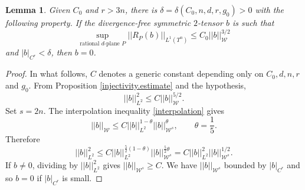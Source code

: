 \documentclass[11pt]{amsart}
\newtheorem{lemm}[thm]{Lemma}
\theoremstyle{remark}
\theoremstyle{definition}
\begin{document}
	\begin{lemm}\label{lemm.quadr.estimate}
		Given $C_0$ and $r>3n$, there is {$\delta=\delta(C_0,n,d,r,g_0)>0$} with the following property. If the divergence-free symmetric $2$-tensor $b$ is such that
		$$
		\sup_{\text{rational }d\text{-plane }P}||R_P(b)||_{L^1(T^n)}\leq C_0||b||_{\mathcal W}^{3/2}
		$$
		and $|b|_{C^r}<\delta$, then $b=0$.
	\end{lemm}
	\begin{proof}
		In what follows, $C$ denotes a generic constant depending only on $C_0,d,n,r$ and $g_0$.
		From Proposition \ref{injectivity.estimate} and the hypothesis,
		$$
		||b||_{L^2}^2\leq C||b||_{\mathcal W}^{5/2}.
		$$
		Set $s=2n$. The interpolation inequality \eqref{interpolation} gives
		$$
		||b||_{\mathcal W}\leq C||b||_{L^2}^{1-\theta}||b||_{\mathcal W^s}^\theta,\qquad \theta=\frac{1}{5}.
		$$
		Therefore
		$$
		||b||_{L^2}^2\leq C||b||_{L^2}^{\frac52(1-\theta)}||b||_{\mathcal W^s}^{\frac52\theta}=C||b||_{L^2}^2||b||_{\mathcal W^s}^{1/2}.
		$$
		If $b\neq0$, dividing by $||b||_{L^2}^2$ gives
		$
		||b||_{\mathcal W^s}\geq C.
		$ We have $||b||_{\mathcal W^s}$ bounded by $|b|_{C^r}$ and so $b=0$ if $|b|_{C^r}$  is small.
	\end{proof}
	
	
	
	
\end{document}
